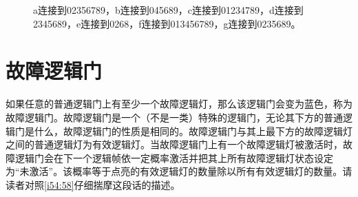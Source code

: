 \begin{figure}[!ht]
\begin{center}
\subfloat{}
\end{center}
\caption{a连接到02356789，b连接到045689，c连接到01234789，d连接到2345689，e连接到0268，f连接到013456789，g连接到0235689。}
\label{i42:43}
\end{figure}

\section{故障逻辑门}

如果任意的普通逻辑门上有至少一个故障逻辑灯，那么该逻辑门会变为蓝色，称为故障逻辑门。故障逻辑门是一个（不是一类）特殊的逻辑门，无论其下方的普通逻辑门是什么，故障逻辑门的性质是相同的。故障逻辑门与其上最下方的故障逻辑灯之间的普通逻辑灯为有效逻辑灯。当故障逻辑门上有一个故障逻辑灯被激活时，故障逻辑门会在下一个逻辑帧依一定概率激活并把其上所有故障逻辑灯状态设定为“未激活”。该概率等于点亮的有效逻辑灯的数量除以所有有效逻辑灯的数量。请读者对照\autoref{i54:58}仔细揣摩这段话的描述。

